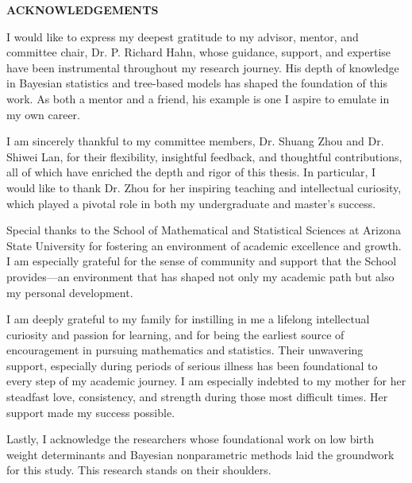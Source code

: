\begin{center}
    {\large \textbf{ACKNOWLEDGEMENTS}}
\end{center}

I would like to express my deepest gratitude to my advisor, mentor, and committee chair, Dr. P. Richard Hahn, whose guidance, support, and expertise have been instrumental throughout my research journey. His depth of knowledge in Bayesian statistics and tree-based models has shaped the foundation of this work. As both a mentor and a friend, his example is one I aspire to emulate in my own career.

I am sincerely thankful to my committee members, Dr. Shuang Zhou and Dr. Shiwei Lan, for their flexibility, insightful feedback, and thoughtful contributions, all of which have enriched the depth and rigor of this thesis. In particular, I would like to thank Dr. Zhou for her inspiring teaching and intellectual curiosity, which played a pivotal role in both my undergraduate and master's success. 

Special thanks to the School of Mathematical and Statistical Sciences at Arizona State University for fostering an environment of academic excellence and growth. I am especially grateful for the sense of community and support that the School provides—an environment that has shaped not only my academic path but also my personal development.

I am deeply grateful to my family for instilling in me a lifelong intellectual curiosity and passion for learning, and for being the earliest source of encouragement in pursuing mathematics and statistics. Their unwavering support, especially during periods of serious illness has been foundational to every step of my academic journey. I am especially indebted to my mother for her steadfast love, consistency, and strength during those most difficult times. Her support made my success possible. 

Lastly, I acknowledge the researchers whose foundational work on low birth weight determinants and Bayesian nonparametric methods laid the groundwork for this study. This research stands on their shoulders.
\clearpage